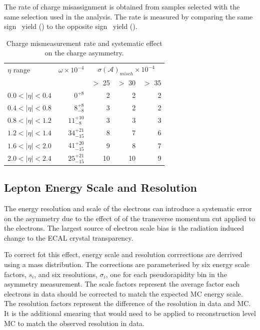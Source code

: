The rate of charge misassignment is obtained from \Zee samples selected with
the same selection used in the analysis. The rate is measured by comparing the
same sign \PZ\ yield (\HepProcess{\PZ\to\Pepm\Pepm}) to the opposite sign \PZ\
yield (\HepProcess{\PZ\to\Pepm\Pemp}).

\begin{table}[htbp]
  \begin{center}
\begin{tabular}{lrrrr}
\toprule
$\eta$ range        & $\omega \times 10^{-4}$  & \multicolumn{3}{c}{$\sigma(\mathcal{A})_{misch}\times 10^{-4}$}\\
& & \PT $>$ 25 \GeV & \PT $>$ 30 \GeV & \PT $>$ 35 \GeV \\
\midrule
$0.0<| \eta |<0.4$  & $0^{+8}$          &  2 &  2 & 2 \\ 
$0.4<| \eta |<0.8$  & $8^{+8}_{-8}$     &  3 &  2 & 2 \\
$0.8<| \eta |<1.2$  & $11^{+10}_{-8}$   &  3 &  3 & 3 \\
$1.2<| \eta |<1.4$  & $34^{+21}_{-15}$  &  8 &  7 & 6 \\
$1.6<| \eta |<2.0$  & $41^{+20}_{-15}$  &  9 &  8 & 7 \\
$2.0<| \eta |<2.4$  & $25^{+21}_{-15}$  & 10 & 10 & 9 \\
\bottomrule
\end{tabular}
\caption{\label{tab:mischarge}Charge mismeasurement rate and systematic effect on the charge asymmetry.}
\end{center}
\end{table}

\subsection{Lepton Energy Scale and Resolution}

The energy resolution and scale of the electrons can introduce a systematic
error on the asymmetry due to the effect of of the transverse momentum cut
applied to the electrons. The largest source of electron scale bias is the
radiation induced change to the ECAL crystal transparency.

To correct fot this effect, energy scale and resolution corrrections are
derrived using a \Zee mass distribution. The corrections are parameterised by
six energy scale factors, $s_i$, and six resolutions, $\sigma_i$, one for each
pseudorapidity bin in the asymmetry measurement.
The scale factors represent the average factor each electrons \Pt in data
should be corrected to match the expected \ac{MC} energy scale.
The resolution factors represent the difference of the resolution in data and
\ac{MC}. It is the additional smearing that would need to be applied to
reconstruction level \ac{MC} to match the observed resolution in data.

